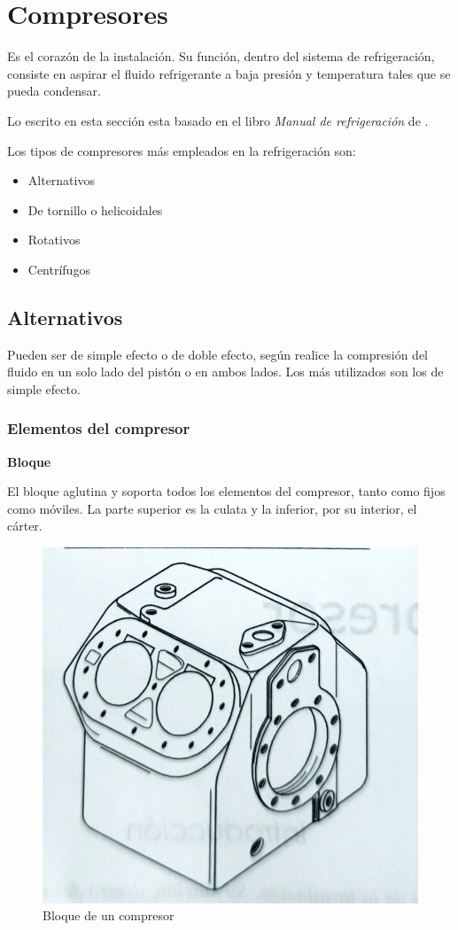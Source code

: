 \section{Compresores}

Es el coraz\'on de la instalaci\'on. Su funci\'on, dentro del sistema de refrigeración, consiste en aspirar el fluido refrigerante a baja presi\'on y temperatura tales que se pueda condensar.

Lo escrito en esta secci\'on esta basado en el libro \textit{Manual de refrigeración} de \cite[cap\'itulo 3]{Franco2016Manual}.

Los tipos de compresores m\'as empleados en la refrigeración son:

\begin{itemize}
	\item Alternativos 
	\item De tornillo o helicoidales
	\item Rotativos
	\item Centr\'ifugos
\end{itemize}

\subsection{Alternativos}

Pueden ser de simple efecto o de doble efecto, seg\'un realice la compresi\'on del fluido en un solo lado del pist\'on o en ambos lados. Los m\'as utilizados son los de simple efecto.

\subsubsection{Elementos del compresor}

\textbf{Bloque}

El bloque aglutina y soporta todos los elementos del compresor, tanto como fijos como m\'oviles. La parte superior es la culata y la inferior, por su interior, el c\'arter.

\begin{figure}[H]
	\centering
	\includegraphics[width=.5\linewidth]{figuras/compresores/bloque}
	\caption{Bloque de un compresor}
	\label{fig:Bloque de un compresor}
\end{figure}

